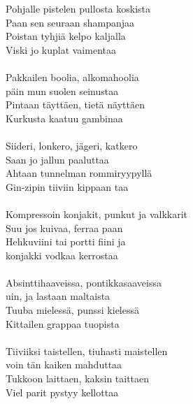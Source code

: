 
Pohjalle pistelen pullosta koskista\\
Paan sen seuraan shampanjaa\\
Poistan tyhjiä kelpo kaljalla\\
Viski jo kuplat vaimentaa\\
\hspace{10mm}
\\Pakkailen boolia, alkomahoolia\\
päin mun suolen seinustaa\\
Pintaan täyttäen, tietä näyttäen\\
Kurkusta kaatuu gambinaa\\
\hspace{10mm}
\\Siideri, lonkero, jägeri, katkero\\
Saan jo jallun paaluttaa\\
Ahtaan tunnelman rommiryypyllä\\
Gin-zipin tiiviin kippaan taa\\
\hspace{10mm}
\\Kompressoin konjakit, punkut ja valkkarit\\
Suu jos kuivaa, ferraa paan\\
Hehkuviini tai portti fiini ja\\
konjakki vodkaa kerrostaa\\
\hspace{10mm}
\\Absinttihaaveissa, pontikkasaaveissa\\
uin, ja lastaan maltaista\\
Tuuba mielessä, punssi kielessä\\
Kittailen grappaa tuopista\\
\hspace{10mm}
\\Tiiviiksi taistellen, tiuhasti maistellen\\
voin tän kaiken mahduttaa\\
Tukkoon laittaen, kaksin taittaen\\Viel parit pystyy kellottaa\\